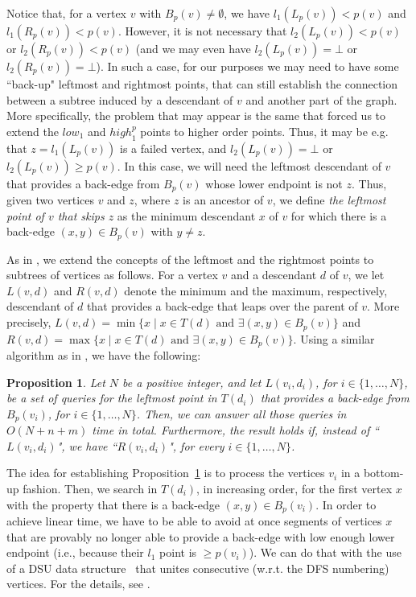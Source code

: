 \documentclass[11pt,a4paper]{article}
\newtheorem{proposition}[theorem]{Proposition}
\begin{document}
Notice that, for a vertex $v$ with $B_p(v)\neq\emptyset$, we have $l_1(L_p(v))<p(v)$ and $l_1(R_p(v))<p(v)$. However, it is not necessary that $l_2(L_p(v))<p(v)$ or $l_2(R_p(v))<p(v)$ (and we may even have $l_2(L_p(v))=\bot$ or $l_2(R_p(v))=\bot$). In such a case, for our purposes we may need to have some ``back-up" leftmost and rightmost points, that can still establish the connection between a subtree induced by a descendant of $v$ and another part of the graph. More specifically, the problem that may appear is the same that forced us to extend the $\mathit{low}_1$ and $\mathit{high}^p_1$ points to higher order points. Thus, it may be e.g. that $z=l_1(L_p(v))$ is a failed vertex, and $l_2(L_p(v))=\bot$ or $l_2(L_p(v))\geq p(v)$. In this case, we will need the leftmost descendant of $v$ that provides a back-edge from $B_p(v)$ whose lower endpoint is not $z$. Thus, given two vertices $v$ and $z$, where $z$ is an ancestor of $v$, we define \emph{the leftmost point of $v$ that skips $z$} as the minimum descendant $x$ of $v$ for which there is a back-edge $(x,y)\in B_p(v)$ with $y\neq z$.

As in \cite{DBLP:conf/soda/Kosinas24}, we extend the concepts of the leftmost and the rightmost points to subtrees of vertices as follows. For a vertex $v$ and a descendant $d$ of $v$, we let $L(v,d)$ and $R(v,d)$ denote the minimum and the maximum, respectively, descendant of $d$ that provides a back-edge that leaps over the parent of $v$. More precisely, $L(v,d)=\min\{x\mid x\in T(d) \mbox{ and } \exists (x,y)\in B_p(v)\}$ and $R(v,d)=\max\{x\mid x\in T(d) \mbox{ and } \exists (x,y)\in B_p(v)\}$. Using a similar algorithm as in \cite{DBLP:conf/soda/Kosinas24}, we have the following:

\begin{proposition}
\label{proposition:L(v,d)}
Let $N$ be a positive integer, and let $L(v_i,d_i)$, for $i\in\{1,\dots,N\}$, be a set of queries for the leftmost point in $T(d_i)$ that provides a back-edge from $B_p(v_i)$, for $i\in\{1,\dots,N\}$. Then, we can answer all those queries in $O(N+n+m)$ time in total. Furthermore, the result holds if, instead of ``$L(v_i,d_i)$", we have ``$R(v_i,d_i)$", for every $i\in\{1,\dots,N\}$. 
\end{proposition}

The idea for establishing Proposition~\ref{proposition:L(v,d)} is to process the vertices $v_i$ in a bottom-up fashion. Then, we search in $T(d_i)$, in increasing order, for the first vertex $x$ with the property that there is a back-edge $(x,y)\in B_p(v_i)$. In order to achieve linear time, we have to be able to avoid at once segments of vertices $x$ that are provably no longer able to provide a back-edge with low enough lower endpoint (i.e., because their $l_1$ point is $\geq p(v_i)$). We can do that with the use of a DSU data structure~\cite{DBLP:journals/jcss/GabowT85} that unites consecutive (w.r.t. the DFS numbering) vertices. For the details, see \cite{DBLP:conf/soda/Kosinas24}. 
\end{document}
